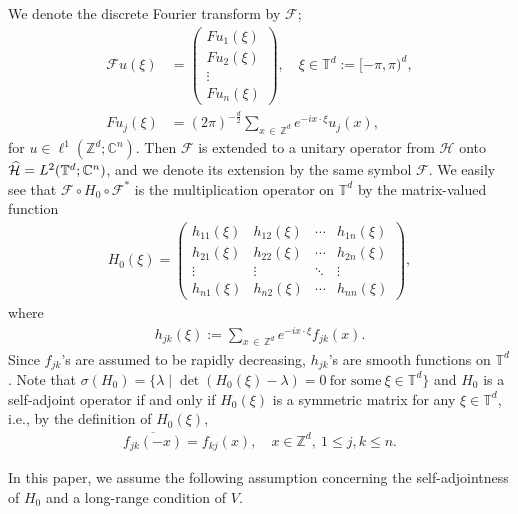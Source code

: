\documentclass[10pt,a4paper]{amsart}
\newcommand{\x}{\xi}
\newcommand{\C}{\mathbb{C}}
\newcommand{\Z}{\mathbb{Z}}
\newcommand{\T}{\mathbb{T}}
\newcommand{\HS}{\mathcal{H}}
\newcommand{\FS}{\mathcal{F}}
\let\oldhat\hat
\renewcommand*{\hat}[1]{\mathchoice{\widehat{#1}}{\widehat{#1}}{\oldhat{#1}}{\oldhat{#1}}}
\begin{document}
We denote the discrete Fourier transform by $\FS$;
\begin{align*}
\FS u(\xi) &=
\begin{pmatrix}
Fu_1(\xi) \\
Fu_2(\xi) \\
\vdots \\
Fu_n(\xi)
\end{pmatrix}, \quad \xi \in \T^d:=[-\pi,\pi)^d, \\
F u_j(\x) &= (2\pi)^{-\frac{d}{2}}\sum_{x\,\in\,\Z^d}e^{-ix\cdot\x}u_j(x),
\end{align*}
for $u\in \ell^1(\Z^d;\C^n)$. Then $\FS$ is extended to a unitary operator from $\HS$ onto $\hat{\HS}=L^2(\T^d; \C^n)$, and we denote its extension by the same symbol $\FS$. We easily see that $\FS \circ H_0 \circ \FS^*$ is the multiplication operator on $\T^d$ by the matrix-valued function
\begin{align*}
H_0(\xi) = 
\begin{pmatrix}
h_{11}(\xi) & h_{12}(\xi) & \cdots & h_{1n}(\xi) \\
h_{21}(\xi) & h_{22}(\xi) & \cdots & h_{2n}(\xi) \\
\vdots & \vdots & \ddots & \vdots \\
h_{n1}(\xi) & h_{n2}(\xi) & \cdots & h_{nn}(\xi)
\end{pmatrix},
\end{align*}
where
\begin{align*}
h_{jk}(\xi):=\sum_{x\,\in\,\Z^d}e^{-ix\cdot\xi}f_{jk}(x).
\end{align*}
Since $f_{jk}$'s are assumed to be rapidly decreasing, $h_{jk}$'s are smooth functions on $\T^d$. Note that $\sigma(H_0) = \{ \lambda \mid \det (H_0(\xi)-\lambda) =0 \ \text{for some}\ \xi \in \T^d \} $ and $H_0$ is a self-adjoint operator if and only if $H_0(\x)$ is a symmetric matrix for any $\x\in\T^d$, i.e., by the definition of $H_0(\x)$,
\begin{align}\label{selfadj}
\overline{f_{jk}(-x)}=f_{kj}(x), \quad x \in \Z^d, \ 1 \leq j,k \leq n.
\end{align}


In this paper, we assume the following assumption concerning the self-adjointness of $H_0$ and a long-range condition of $V$.
\end{document}
